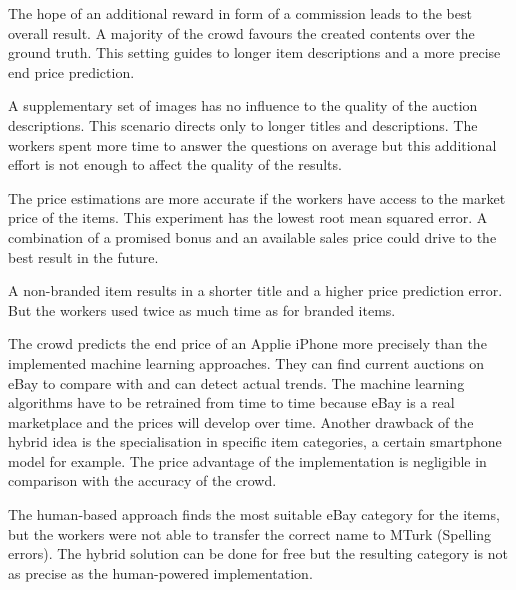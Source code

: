 The hope of an additional reward in form of a commission leads to the best overall result. A majority of the crowd favours the created contents over the ground truth. This setting guides to longer item descriptions and a more precise end price prediction.

A supplementary set of images has no influence to the quality of the auction descriptions. This scenario directs only to longer titles and descriptions. The workers spent more time to answer the questions on average but this additional effort is not enough to affect the quality of the results.

The price estimations are more accurate if the workers have access to the market price of the items. This experiment has the lowest root mean squared error. A combination of a promised bonus and an available sales price could drive to the best result in the future.

A non-branded item results in a shorter title and a higher price prediction error. But the workers used twice as much time as for branded items.

The crowd predicts the end price of an Applie iPhone more precisely than the implemented machine learning approaches. They can find current auctions on eBay to compare with and can detect actual trends. The machine learning algorithms have to be retrained from time to time because eBay is a real marketplace and the prices will develop over time. Another drawback of the hybrid idea is the specialisation in specific item categories, a certain smartphone model for example. The price advantage of the implementation is negligible in comparison with the accuracy of the crowd.

The human-based approach finds the most suitable eBay category for the items, but the workers were not able to transfer the correct name to MTurk (Spelling errors). The hybrid solution can be done for free but the resulting category is not as precise as the human-powered implementation.
